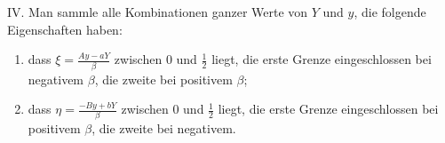 IV. Man sammle alle Kombinationen ganzer Werte von $Y$ und $y$, die folgende Eigenschaften haben:
\begin{enumerate}
\item dass $\xi=\frac{Ay-aY}{\beta}$ zwischen $0$ und $\frac12$ liegt, die erste Grenze eingeschlossen bei negativem $\beta$, die zweite bei positivem $\beta$;
\item dass $\eta=\frac{-By+bY}{\beta}$ zwischen $0$ und $\frac12$ liegt, die erste Grenze eingeschlossen bei positivem $\beta$, die zweite bei negativem.
\end{enumerate}
